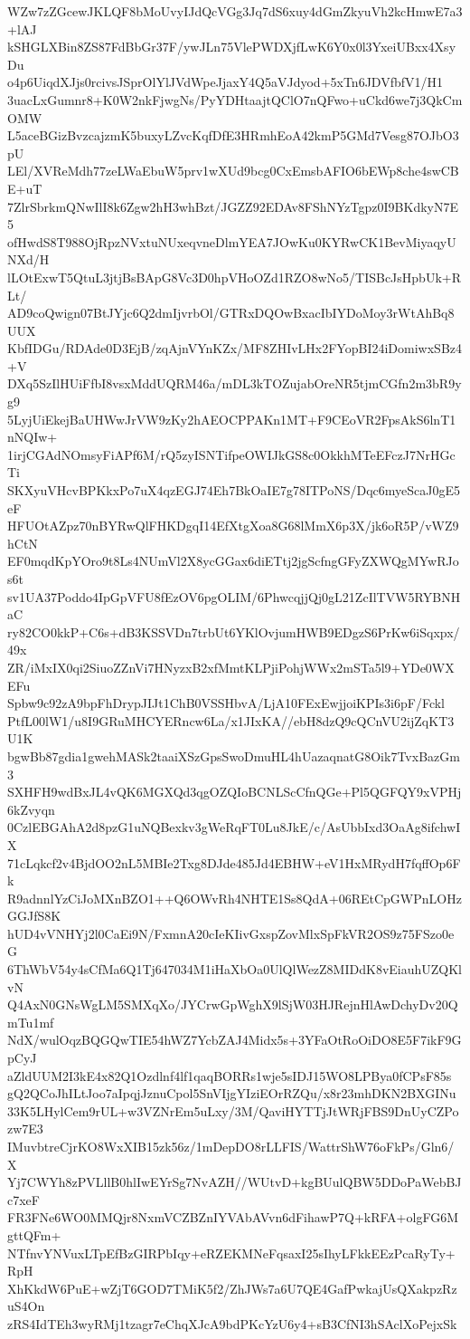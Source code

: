 WZw7zZGcewJKLQF8bMoUvyIJdQcVGg3Jq7dS6xuy4dGmZkyuVh2kcHmwE7a3+lAJ
kSHGLXBin8ZS87FdBbGr37F/ywJLn75VlePWDXjfLwK6Y0x0l3YxeiUBxx4XsyDu
o4p6UiqdXJjs0rcivsJSprOlYlJVdWpeJjaxY4Q5aVJdyod+5xTn6JDVfbfV1/H1
3uacLxGumnr8+K0W2nkFjwgNs/PyYDHtaajtQClO7nQFwo+uCkd6we7j3QkCmOMW
L5aceBGizBvzcajzmK5buxyLZvcKqfDfE3HRmhEoA42kmP5GMd7Vesg87OJbO3pU
LEl/XVReMdh77zeLWaEbuW5prv1wXUd9bcg0CxEmsbAFIO6bEWp8che4swCBE+uT
7ZlrSbrkmQNwIlI8k6Zgw2hH3whBzt/JGZZ92EDAv8FShNYzTgpz0I9BKdkyN7E5
ofHwdS8T988OjRpzNVxtuNUxeqvneDlmYEA7JOwKu0KYRwCK1BevMiyaqyUNXd/H
lLOtExwT5QtuL3jtjBsBApG8Vc3D0hpVHoOZd1RZO8wNo5/TISBcJsHpbUk+RLt/
AD9coQwign07BtJYjc6Q2dmIjvrbOl/GTRxDQOwBxacIbIYDoMoy3rWtAhBq8UUX
KbfIDGu/RDAde0D3EjB/zqAjnVYnKZx/MF8ZHIvLHx2FYopBI24iDomiwxSBz4+V
DXq5SzIlHUiFfbI8vsxMddUQRM46a/mDL3kTOZujabOreNR5tjmCGfn2m3bR9yg9
5LyjUiEkejBaUHWwJrVW9zKy2hAEOCPPAKn1MT+F9CEoVR2FpsAkS6lnT1nNQIw+
1irjCGAdNOmsyFiAPf6M/rQ5zyISNTifpeOWIJkGS8c0OkkhMTeEFczJ7NrHGcTi
SKXyuVHcvBPKkxPo7uX4qzEGJ74Eh7BkOaIE7g78ITPoNS/Dqc6myeScaJ0gE5eF
HFUOtAZpz70nBYRwQlFHKDgqI14EfXtgXoa8G68lMmX6p3X/jk6oR5P/vWZ9hCtN
EF0mqdKpYOro9t8Ls4NUmVl2X8ycGGax6diETtj2jgScfngGFyZXWQgMYwRJos6t
sv1UA37Poddo4IpGpVFU8fEzOV6pgOLIM/6PhwcqjjQj0gL21ZcIlTVW5RYBNHaC
ry82CO0kkP+C6s+dB3KSSVDn7trbUt6YKlOvjumHWB9EDgzS6PrKw6iSqxpx/49x
ZR/iMxIX0qi2SiuoZZnVi7HNyzxB2xfMmtKLPjiPohjWWx2mSTa5l9+YDe0WXEFu
Spbw9c92zA9bpFhDrypJIJt1ChB0VSSHbvA/LjA10FExEwjjoiKPIs3i6pF/Fckl
PtfL00lW1/u8I9GRuMHCYERncw6La/x1JIxKA//ebH8dzQ9cQCnVU2ijZqKT3U1K
bgwBb87gdia1gwehMASk2taaiXSzGpsSwoDmuHL4hUazaqnatG8Oik7TvxBazGm3
SXHFH9wdBxJL4vQK6MGXQd3qgOZQIoBCNLScCfnQGe+Pl5QGFQY9xVPHj6kZvyqn
0CzlEBGAhA2d8pzG1uNQBexkv3gWeRqFT0Lu8JkE/c/AsUbbIxd3OaAg8ifchwIX
71cLqkcf2v4BjdOO2nL5MBIe2Txg8DJde485Jd4EBHW+eV1HxMRydH7fqffOp6Fk
R9adnnlYzCiJoMXnBZO1++Q6OWvRh4NHTE1Ss8QdA+06REtCpGWPnLOHzGGJfS8K
hUD4vVNHYj2l0CaEi9N/FxmnA20cIeKIivGxspZovMlxSpFkVR2OS9z75FSzo0eG
6ThWbV54y4sCfMa6Q1Tj647034M1iHaXbOa0UlQlWezZ8MIDdK8vEiauhUZQKlvN
Q4AxN0GNsWgLM5SMXqXo/JYCrwGpWghX9lSjW03HJRejnHlAwDchyDv20QmTu1mf
NdX/wulOqzBQGQwTIE54hWZ7YcbZAJ4Midx5s+3YFaOtRoOiDO8E5F7ikF9GpCyJ
aZldUUM2I3kE4x82Q1Ozdlnf4lf1qaqBORRs1wje5sIDJ15WO8LPBya0fCPsF85s
gQ2QCoJhILtJoo7aIpqjJznuCpol5SnVIjgYIziEOrRZQu/x8r23mhDKN2BXGINu
33K5LHylCem9rUL+w3VZNrEm5uLxy/3M/QaviHYTTjJtWRjFBS9DnUyCZPozw7E3
IMuvbtreCjrKO8WxXIB15zk56z/1mDepDO8rLLFIS/WattrShW76oFkPs/Gln6/X
Yj7CWYh8zPVLllB0hlIwEYrSg7NvAZH//WUtvD+kgBUulQBW5DDoPaWebBJc7xeF
FR3FNe6WO0MMQjr8NxmVCZBZnIYVAbAVvn6dFihawP7Q+kRFA+olgFG6MgttQFm+
NTfnvYNVuxLTpEfBzGIRPbIqy+eRZEKMNeFqsaxI25sIhyLFkkEEzPcaRyTy+RpH
XhKkdW6PuE+wZjT6GOD7TMiK5f2/ZhJWs7a6U7QE4GafPwkajUsQXakpzRzuS4On
zRS4IdTEh3wyRMj1tzagr7eChqXJcA9bdPKcYzU6y4+sB3CfNI3hSAclXoPejxSk
